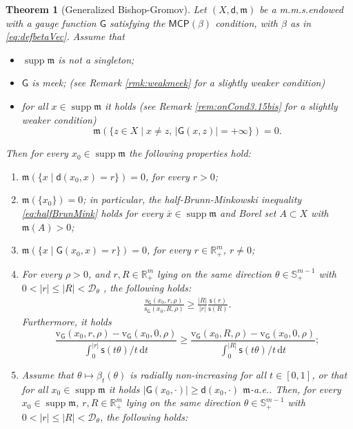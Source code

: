 \documentclass[11pt,a4paper]{article}
\theoremstyle{plain}
\newtheorem{theorem}{Theorem}[section]
\theoremstyle{definition}
\theoremstyle{remark}
\numberwithin{equation}{section}
\newcommand{\R}{\mathbb{R}} %
\DeclareMathOperator{\supp}{\mathrm{supp}}
\newcommand{\MCP}{\mathsf{MCP}}
\newcommand{\cD}{\mathcal{D}}
\newcommand{\sfs}{\mathsf{s}}
\newcommand{\rv}{\mathrm{v}}
\newcommand{\rs}{\mathrm{s}}
\newcommand{\di}{\mathrm{d}}
\newcommand{\mm}{\mathfrak m}
\newcommand{\sfd}{\mathsf d}
\newcommand{\sfG}{\mathsf G}
\begin{document}
\begin{theorem}[Generalized Bishop-Gromov] \label{thm:BG1Vec}
Let $(X,\sfd,\mm)$ be a m.m.s.\@ endowed with a gauge function $\sfG$ satisfying the $\MCP(\beta)$ condition, with $\beta$ as in \eqref{eq:defbetaVec}.
Assume that 
\begin{itemize}
\item $\supp \mm$ is not a singleton;
\item $\sfG$ is meek;  (see Remark \ref{rmk:weakmeek} for a slightly weaker condition)
\item for all $x\in \supp\mm$ it holds (see Remark \ref{rem:onCond3.15bis} for a slightly weaker condition)
\begin{equation}\label{eq:GfiniteVec}
\mm(\{z\in X \mid x\neq z, \, |\sfG(x, z)|=+\infty\})=0.
\end{equation}
\end{itemize}
Then for every $x_0\in\supp\mm$ the following properties hold:
\begin{enumerate}[label = (\roman*)]
\item \label{i:BG1Vec} $\mm(\{x \mid \sfd(x_0,x) = r\})=0$, for every $r >0 $;
\item \label{i:BG2Vec} $\mm(\{x_0\})=0$; in particular, the half-Brunn-Minkowski inequality \eqref{eq:halfBrunMink} holds for every $\bar{x}\in \supp\mm$ and Borel set $A\subset X$ with $\mm(A)>0$;
\item \label{i:BG3Vec} $\mm(\{x \mid \sfG(x_0,x) = r\})=0$, for every $r \in \R^m_+$, $r\neq 0$;
\item \label{i:BG4Vec}  For every $\rho>0$, and  $r,R\in \mathbb{R}^{m}_+$ lying on the same direction $\theta\in \mathbb{S}^{m-1}_+$ with $0<|r|\leq |R|<\cD_{\theta}$ , the following holds:
\begin{align}
\frac{\rs_{\sfG}(x_{0}, r,\rho)}{ \rs_{\sfG}(x_{0}, R,\rho)} \geq \frac{|R|}{|r|}  \frac{\sfs( r )}{ \sfs(R)}. \label{eq:BisGr1VecS}
\end{align}
Furthermore, it holds
 \begin{equation} \label{eq:BisGr1VecV}
  \frac{\rv_{\sfG}(x_{0}, r,\rho)-\rv_{\sfG}(x_{0}, 0,\rho)}{ \int_{0}^{|r|} \sfs(t\theta)/t \, \di t} \geq \frac{\rv_{\sfG}(x_{0}, R,\rho)-\rv_{\sfG}(x_{0}, 0,\rho)}{ \int_0^{|R|} \sfs(t\theta)/t\, \di t}; 
 \end{equation}
\item \label{i:BG5Vec}  Assume that  $\theta \mapsto \beta_t(\theta)$ is radially  non-increasing for all $t\in [0,1]$, or that for all $x_0\in\supp\mm$ it holds $|\sfG(x_0,\cdot)| \geq \sfd(x_0,\cdot)$ $\mm$-a.e.. Then, for every $x_{0}\in \supp\mm$, $r,R\in \mathbb{R}^{m}_+$ lying on the same direction $\theta\in \mathbb{S}^{m-1}_+$ with $0<|r|\leq |R|<\cD_{\theta}$, the following holds:

\end{enumerate}
\end{theorem}
\end{document}
